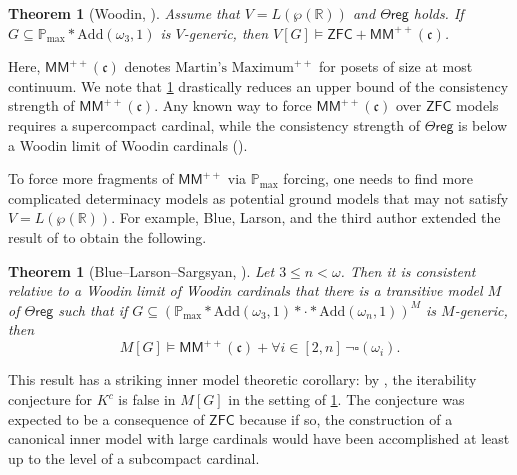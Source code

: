 \documentclass{amsart}
\newtheorem{thm}[dfn]{Theorem}
\renewcommand{\subset}{\subseteq}
\newcommand{\power}{\wp}
\begin{document}
\begin{thm}[Woodin, \cite{Wo10}]\label{Forcing_MM^++(c)}
    Assume that $V=L(\power(\mathbb{R}))$ and $\Theta\mathsf{reg}$ holds.
    If $G\subset\mathbb{P}_{\mathrm{max}}*\mathrm{Add}(\omega_3, 1)$ is $V$-generic, then $V[G]\models\mathsf{ZFC}+\mathsf{MM}^{++}(\mathfrak{c})$.
\end{thm}

Here, $\mathsf{MM}^{++}(\mathfrak{c})$ denotes $\text{Martin's Maximum}^{++}$ for posets of size at most continuum.
We note that \cref{Forcing_MM^++(c)} drastically reduces an upper bound of the consistency strength of $\mathsf{MM}^{++}(\mathfrak{c})$.
Any known way to force $\mathsf{MM}^{++}(\mathfrak{c})$ over $\mathsf{ZFC}$ models requires a supercompact cardinal, while the consistency strength of $\Theta\mathsf{reg}$ is below a Woodin limit of Woodin cardinals (\cite{HMMSC}).

To force more fragments of $\mathsf{MM}^{++}$ via $\mathbb{P}_{\mathrm{max}}$ forcing, one needs to find more complicated determinacy models as potential ground models that may not satisfy $V=L(\power(\mathbb{R}))$.
For example, Blue, Larson, and the third author extended the result of \cite{PmaxSquare} to obtain the following.

\begin{thm}[Blue--Larson--Sargsyan, \cite{Nairian}]\label{BlueLarsonSargsyan}
    Let $3\leq n<\omega$.
    Then it is consistent relative to a Woodin limit of Woodin cardinals that there is a transitive model $M$ of $\Theta\mathsf{reg}$ such that if $G\subset(\mathbb{P}_{\mathrm{max}}*\mathrm{Add}(\omega_3, 1)* \cdot *\mathrm{Add}(\omega_n, 1))^M$ is $M$-generic, then
    \[
    M[G]\models\mathsf{MM}^{++}(\mathfrak{c})+\forall i\in [2, n]\,\neg\square(\omega_i).
    \]
\end{thm}

This result has a striking inner model theoretic corollary: by \cite{JSSS09}, the iterability conjecture for $K^c$ is false in $M[G]$ in the setting of \cref{BlueLarsonSargsyan}.
The conjecture was expected to be a consequence of $\mathsf{ZFC}$ because if so, the construction of a canonical inner model with large cardinals would have been accomplished at least up to the level of a subcompact cardinal.
\end{document}
